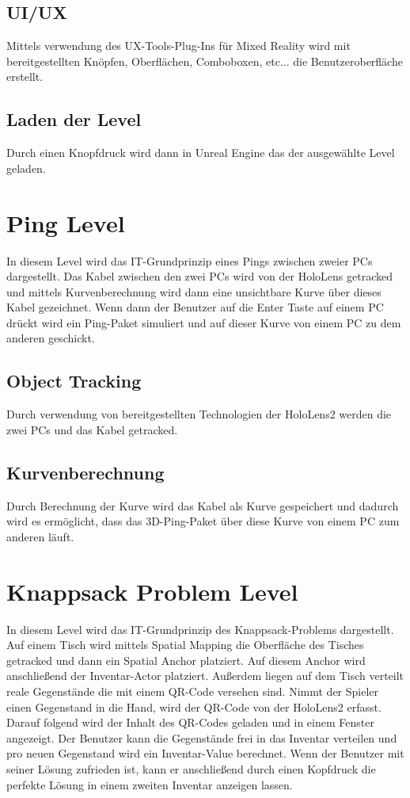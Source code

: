 \subsection{UI/UX}
Mittels verwendung des UX-Tools-Plug-Ins für Mixed Reality wird
mit bereitgestellten Knöpfen, Oberflächen, Comboboxen, etc...
die Benutzeroberfläche erstellt.

\subsection{Laden der Level}
Durch einen Knopfdruck wird dann in Unreal Engine das der ausgewählte
Level geladen.

\section{Ping Level}
In diesem Level wird das IT-Grundprinzip eines Pings zwischen zweier
PCs dargestellt. Das Kabel zwischen den zwei PCs wird von der
HoloLens getracked und mittels Kurvenberechnung wird dann eine
unsichtbare Kurve über dieses Kabel gezeichnet. Wenn dann der Benutzer
auf die Enter Taste auf einem PC drückt wird ein Ping-Paket simuliert
und auf dieser Kurve von einem PC zu dem anderen geschickt.

\subsection{Object Tracking}
Durch verwendung von bereitgestellten Technologien der HoloLens2
werden die zwei PCs und das Kabel getracked.

\subsection{Kurvenberechnung}
Durch Berechnung der Kurve wird das Kabel als Kurve gespeichert
und dadurch wird es ermöglicht, dass das 3D-Ping-Paket über diese
Kurve von einem PC zum anderen läuft.

\section{Knappsack Problem Level}
In diesem Level wird das IT-Grundprinzip des Knappsack-Problems dargestellt.
Auf einem Tisch wird mittels Spatial Mapping die Oberfläche des Tisches
getracked und dann ein Spatial Anchor platziert. Auf diesem Anchor wird
anschließend der Inventar-Actor platziert. Außerdem liegen auf dem Tisch
verteilt reale Gegenstände die mit einem QR-Code versehen sind. Nimmt der
Spieler einen Gegenstand in die Hand, wird der QR-Code von der HoloLens2
erfasst. Darauf folgend wird der Inhalt des QR-Codes geladen und in einem
Fenster angezeigt. Der Benutzer kann die Gegenstände frei in das Inventar
verteilen und pro neuen Gegenstand wird ein Inventar-Value berechnet.
Wenn der Benutzer mit seiner Lösung zufrieden ist, kann er anschließend
durch einen Kopfdruck die perfekte Lösung in einem zweiten Inventar anzeigen
lassen.

